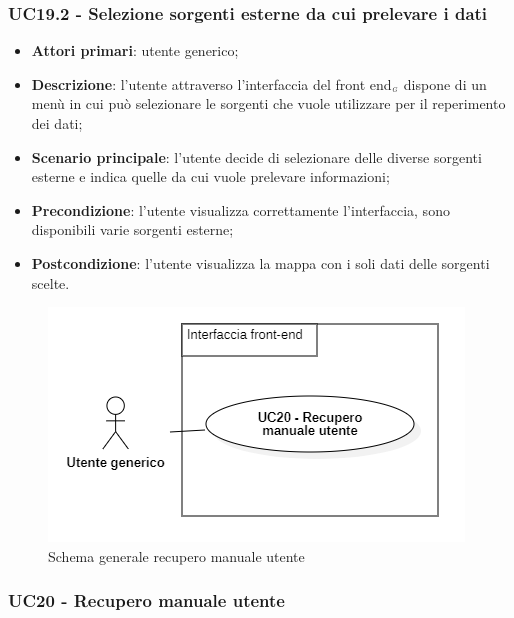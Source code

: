 \subsubsection{UC19.2 - Selezione sorgenti esterne da cui prelevare i dati}\label{CasiDUsoCasiDUsoFacoltativiTraUnUtenteEIlFrontEndElencoCasiDUsoUC112SelezioneSorgentiEsterneDaCuiPrelevareIDati}
\begin{itemize}
	\item \textbf{Attori primari}: utente generico;
	\item \textbf{Descrizione}: l'utente attraverso l'interfaccia del front end$_{\scaleto{G}{3pt}}$ dispone di un menù in cui può selezionare le sorgenti che vuole utilizzare per il reperimento dei dati;
	\item \textbf{Scenario principale}: l'utente decide di selezionare delle diverse sorgenti esterne e indica quelle da cui vuole prelevare informazioni;
	\item \textbf{Precondizione}: l'utente visualizza correttamente l'interfaccia, sono disponibili varie sorgenti esterne;
	\item \textbf{Postcondizione}: l'utente visualizza la mappa con i soli dati delle sorgenti scelte.
\end{itemize}



\begin{center}
	\begin{figure}[H]
		\centering\includegraphics[scale=0.8]{../immagini/attori_casi/UC_20.png}
		\caption{Schema generale recupero manuale utente}
	\end{figure}
\end{center}


\subsubsection{UC20 - Recupero manuale utente}\label{CasiDUsoCasiDUsoFacoltativiTraUnUtenteEIlFrontEndElencoCasiDUsoUC12RecuperoManualeUtente}



